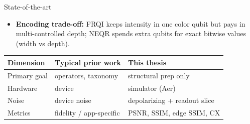 \documentclass[aspectratio=169,11pt,english]{beamer}
\begin{document}
\begin{frame}{State-of-the-art}
  \begin{itemize}
    \item \textbf{Encoding trade-off:} FRQI keeps intensity in one color qubit but pays in multi-controlled depth; NEQR spends extra qubits for exact bitwise values (width vs depth).
  \end{itemize}
  \vspace{0.2cm}
  \begin{center}
    \footnotesize
    \begin{tabular}{lll}
      \hline
      Dimension & Typical prior work & This thesis \\
      \hline
      Primary goal & operators, taxonomy & structural prep only \\
      Hardware & device & simulator (Aer) \\
      Noise & device noise & depolarizing + readout slice \\
      Metrics & fidelity / app-specific & PSNR, SSIM, edge SSIM, CX \\
      \hline
    \end{tabular}
  \end{center}
\end{frame}
\end{document}

